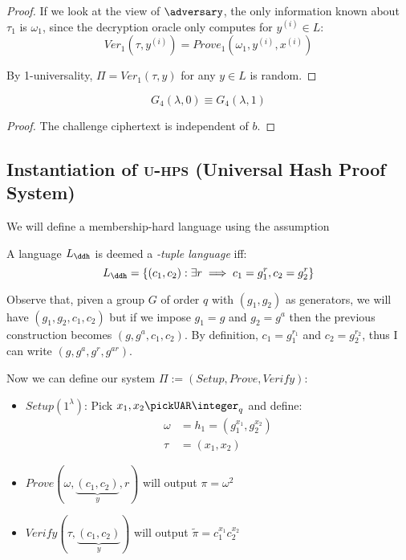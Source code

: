 \begin{proof}
    If we look at the view of $\adversary$, the only information known about $\tau_{1}$ is $\omega_{1}$, since the decryption oracle only computes for $y^{(i)} \in L$:
    \[
        Ver_{1}(\tau, y^{(i)})=Prove_{1}(\omega_{1}, y^{(i)}, x^{(i)})
    \]

    By 1-universality, $\Pi = Ver_{1}(\tau ,y)$ for any $y \in L$ is random.
\end{proof}

\begin{lemma}
    \[
        G_{4}(\lambda, 0)\equiv G_{4}(\lambda, 1)   
    \]
\end{lemma}
\begin{proof}
    The challenge ciphertext is independent of $b$.
\end{proof}






\subsection{Instantiation of \textsc{u-hps} (Universal Hash Proof System)}

We will define a membership-hard language using the \ddh{} assumption

\begin{definition}
    A language $L_\ddh$ is deemed a \emph{\ddh-tuple language} iff:
    \[
        L_\ddh = \{(c_1, c_2) :  \exists r \implies c_1 = g_1^r, c_2 = g_2^r\} \qedhere
    \]
\end{definition}

Observe that, piven a group $G$ of order $q$ with $(g_1, g_2)$ as generators, we will have $(g_1, g_2, c_1, c_2)$ but if we impose $g_1 = g$ and $g_2=g^a$ then the previous construction becomes $(g, g^a, c_1, c_2)$. By definition, $c_1 = g_1^{r_1}$ and $c_2 = g_2^{r_2}$, thus I can write $(g, g^a, g^r, g^{ar})$.

Now we can define our system $\Pi := (Setup, Prove, Verify)$:

\begin{itemize}
    \item $Setup(1^\lambda)$: Pick $x_1,x_2 \pickUAR \integer_q$ and define:
    \begin{align*}
        \omega  &= h_1 = (g_1^{x_1}, g_2^{x_2}) \\
        \tau    &= (x_1, x_2)
    \end{align*}
    \item $Prove(\omega, \underbrace{(c_1,c_2)}_y, r)$ will output $\pi = \omega^2$
    \item $Verify(\tau, \underbrace{(c_1,c_2)}_y)$ will output $\widetilde{\pi} = c_1^{x_1} c_2^{x_2}$
\end{itemize}

